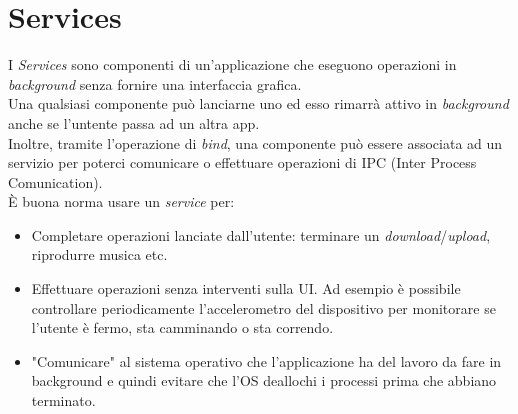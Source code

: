 \chapter{Services}

I \textit{Services} sono componenti di un'applicazione che eseguono operazioni in \textit{background} senza fornire una interfaccia grafica. \\
Una qualsiasi componente può lanciarne uno ed esso rimarrà attivo in \textit{background} anche se l'untente passa ad un altra app.\\
Inoltre, tramite l'operazione di \textit{bind}, una componente può essere associata ad un servizio per poterci comunicare o effettuare operazioni di IPC (Inter Process Comunication).\\
È buona norma usare un \textit{service} per:
\begin{itemize}
	\item Completare operazioni lanciate dall'utente: terminare un \textit{download}/\textit{upload}, riprodurre musica etc.
	\item Effettuare operazioni senza interventi sulla UI. Ad esempio è possibile controllare periodicamente l'accelerometro del dispositivo per monitorare se l'utente è fermo, sta camminando o sta correndo.
	\item "Comunicare" al sistema operativo che l'applicazione ha del lavoro da fare in background e quindi evitare che l'OS deallochi i processi prima che abbiano terminato.
\end{itemize}

